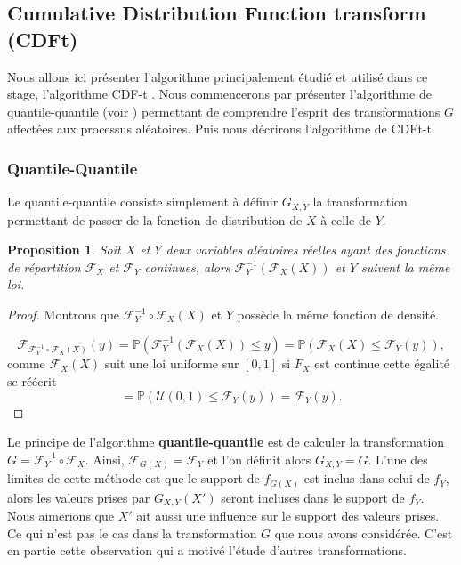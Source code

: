\documentclass[a4paper,11pt]{article}
\newtheorem{proposition}{Proposition}
\begin{document}
\subsection{Cumulative Distribution Function transform (CDFt)}
Nous allons ici présenter l'algorithme principalement étudié et utilisé dans ce stage, l'algorithme CDF-t \cite{vrac2012dynamical}. Nous commencerons par présenter l'algorithme de quantile-quantile (voir ) permettant de comprendre l'esprit des transformations $G$ affectées aux processus aléatoires. Puis nous décrirons l'algorithme de CDFt-t. 
 
\subsubsection{Quantile-Quantile}
\label{Q-Q}
Le quantile-quantile consiste simplement à définir $G_{X,Y}$ la transformation permettant de passer de la fonction de distribution de $X$ à celle de $Y$. 
\begin{proposition}
	Soit $X$ et $Y$ deux variables aléatoires réelles ayant des fonctions de répartition $\mathcal{F}_{X}$ et $\mathcal{F}_{Y}$ continues, alors 
	$\mathcal{F}^{-1}_Y (\mathcal{F}_X(X))$ et $Y$ suivent la même loi. 
\end{proposition}

\begin{proof}
	Montrons que $\mathcal{F}^{-1}_Y \circ \mathcal{F}_X(X)$ et $Y$ possède la même fonction de densité. 
	
	\[\mathcal{F}_{\mathcal{F}^{-1}_Y \circ \mathcal{F}_X(X)}(y)
		= \mathbb{P}(\mathcal{F}^{-1}_Y (\mathcal{F}_X(X))\leq y )
		= \mathbb{P}(\mathcal{F}_{X}(X) \leq \mathcal{F}_Y(y)),\]
	comme $\mathcal{F}_{X}(X)$ suit une loi uniforme sur $[0,1]$ si $F_X$ est continue cette égalité se réécrit
	\[= \mathbb{P}(\mathcal{U}(0,1) \leq \mathcal{F}_Y(y))=\mathcal{F}_Y(y).\]
	
	
\end{proof}
Le principe de l'algorithme \textbf{quantile-quantile} est de calculer la transformation $G=\mathcal{F}^{-1}_{Y} \circ \mathcal{F}_{X}$. Ainsi, $\mathcal{F}_{G(X)}=\mathcal{F}_{Y}$ et l'on définit alors $G_{X,Y}=G$. L'une des limites de cette méthode est que le support de $f_{G(X)}$ est inclus dans celui de $f_{Y}$, alors les valeurs prises par $G
_{X,Y}(X')$ seront incluses dans le support de $f_Y$. Nous aimerions que $X'$ ait aussi une influence sur le support des valeurs prises. Ce qui n'est pas le cas dans la transformation $G$ que nous avons considérée. C'est en partie cette observation qui a motivé l'étude d'autres transformations. 
\end{document}
